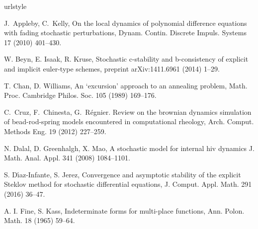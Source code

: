 \documentclass[sort&compress, preprint]{elsarticle}
\theoremstyle{definition}
\theoremstyle{plain}%
\theoremstyle{remark}
\begin{document}
% 
\begin{thebibliography}{26}
\providecommand{\natexlab}[1]{#1}
\providecommand{\url}[1]{\texttt{#1}}
\expandafter\ifx\csname urlstyle\endcsname\relax
  \providecommand{\doi}[1]{doi: #1}\else
  \providecommand{\doi}{doi: \begingroup \urlstyle{rm}\Url}\fi

  
J.~Appleby, C.~Kelly,
\newblock On the local dynamics of polynomial difference equations with fading
  stochastic perturbations,
\newblock Dynam. Contin. Discrete Impuls. Systems 17 (2010)
  401--430.


W. Beyn, E. Isaak, R. Kruse,
\newblock Stochastic c-stability and b-consistency of explicit and implicit
  euler-type schemes,
\newblock preprint arXiv:1411.6961 (2014) 1--29.

T. Chan, D. Williams,
\newblock An `excursion' approach to an annealing problem,
\newblock Math. Proc. Cambridge Philos. Soc. 105 (1989) 169--176.


C.~Cruz, F.~Chinesta, G.~R\'{e}gnier.
\newblock Review on the brownian dynamics simulation of bead-rod-spring models
  encountered in computational rheology,
\newblock Arch. Comput. Methods Eng. 19 (2012) 227--259.

N. Dalal, D. Greenhalgh,  X. Mao,
\newblock A stochastic model for internal hiv dynamics
\newblock J. Math. Anal. Appl.
  341 (2008) 1084--1101.

S. D\'{\i}az-Infante, S. Jerez,
\newblock Convergence and asymptotic stability of the explicit Steklov method
  for stochastic differential equations,
\newblock J. Comput. Appl. Math. 291 (2016) 36--47.

A. I. Fine,  S. Kass,
\newblock Indeterminate forms for multi-place functions,
\newblock Ann. Polon. Math. 18 (1965) 59--64.


\end{thebibliography}
\end{document}
